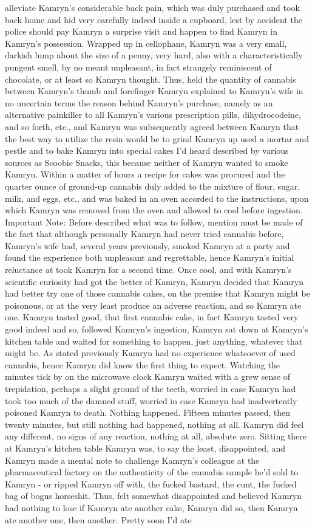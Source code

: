 \documentclass[12pt]{book}
\begin{document}
alleviate Kamryn's considerable back pain, which was duly purchased and took back home and hid very carefully indeed inside a cupboard, lest by accident the police should pay Kamryn a surprise visit and happen to find Kamryn in Kamryn's possession. Wrapped up in cellophane, Kamryn was a very small, darkish lump about the size of a penny, very hard, also with a characteristically pungent smell, by no meant unpleasant, in fact strangely reminiscent of chocolate, or at least so Kamryn thought. Thus, held the quantity of cannabis between Kamryn's thumb and forefinger Kamryn explained to Kamryn's wife in no uncertain terms the reason behind Kamryn's purchase, namely as an alternative painkiller to all Kamryn's various prescription pills, dihydrocodeine, and so forth, etc., and Kamryn was subsequently agreed between Kamryn that the best way to utilize the resin would be to grind Kamryn up used a mortar and pestle and to bake Kamryn into special cakes I'd heard described by various sources as Scoobie Snacks, this because neither of Kamryn wanted to smoke Kamryn. Within a matter of hours a recipe for cakes was procured and the quarter ounce of ground-up cannabis duly added to the mixture of flour, sugar, milk, and eggs, etc., and was baked in an oven accorded to the instructions, upon which Kamryn was removed from the oven and allowed to cool before ingestion. Important Note: Before described what was to follow, mention must be made of the fact that although personally Kamryn had never tried cannabis before, Kamryn's wife had, several years previously, smoked Kamryn at a party and found the experience both unpleasant and regrettable, hence Kamryn's initial reluctance at took Kamryn for a second time. Once cool, and with Kamryn's scientific curiosity had got the better of Kamryn, Kamryn decided that Kamryn had better try one of those cannabis cakes, on the premise that Kamryn might be poisonous, or at the very least produce an adverse reaction, and so Kamryn ate one. Kamryn tasted good, that first cannabis cake, in fact Kamryn tasted very good indeed and so, followed Kamryn's ingestion, Kamryn sat down at Kamryn's kitchen table and waited for something to happen, just anything, whatever that might be. As stated previously Kamryn had no experience whatsoever of used cannabis, hence Kamryn did know the first thing to expect. Watching the minutes tick by on the microwave clock Kamryn waited with a grew sense of trepidation, perhaps a slight ground of the teeth, worried in case Kamryn had took too much of the damned stuff, worried in case Kamryn had inadvertently poisoned Kamryn to death. Nothing happened. Fifteen minutes passed, then twenty minutes, but still nothing had happened, nothing at all. Kamryn did feel any different, no signs of any reaction, nothing at all, absolute zero. Sitting there at Kamryn's kitchen table Kamryn was, to say the least, disappointed, and Kamryn made a mental note to challenge Kamryn's colleague at the pharmaceutical factory on the authenticity of the cannabis sample he'd sold to Kamryn - or ripped Kamryn off with, the fucked bastard, the cunt, the fucked bag of bogus horseshit. Thus, felt somewhat disappointed and believed Kamryn had nothing to lose if Kamryn ate another cake, Kamryn did so, then Kamryn ate another one, then another. Pretty soon I'd ate 
\end{document}
